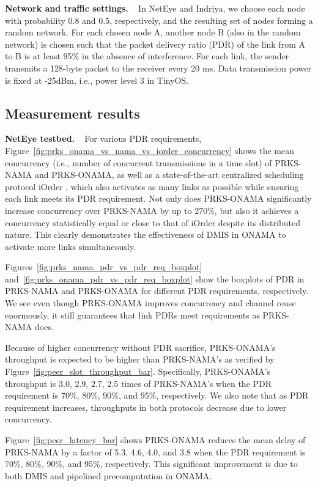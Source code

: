 \documentclass[conference]{IEEEtran}
\newcommand{\vSpacing}{\vspace*{0.05cm}}
\newcommand{\subHeading}[1]{
\vSpacing
\noindent \textbf{#1} \  
}
\begin{document}
\subHeading{Network and traffic settings.}
In NetEye and Indriya, we choose each node with probability 0.8 and 0.5, respectively, and the resulting set of nodes forming a random network. For each chosen node A, another node B (also in the random network) is chosen such that the packet delivery ratio (PDR) of the link from A to B is at least 95\% in the absence of interference. For each link, the sender transmits a 128-byte packet to the receiver every 20 ms. Data transmission power is fixed at -25dBm, i.e., power level 3 in TinyOS.


\subsection{Measurement results}
\subHeading{NetEye testbed.}
For various PDR requirements, Figure~\ref{fig:prks_onama_vs_nama_vs_iorder_concurrency} shows the mean concurrency (i.e., number of concurrent transmissions in a time slot) of PRKS-NAMA and PRKS-ONAMA, as well as a state-of-the-art centralized scheduling protocol iOrder \cite{iorder:che:icnp11}, which also activates as many links as possible while ensuring each link meets its PDR requirement. Not only does PRKS-ONAMA significantly increase concurrency over PRKS-NAMA by up to 270\%, but also it achieves a concurrency statistically equal or close to that of iOrder despite its distributed nature. This clearly demonstrates the effectiveness of DMIS in ONAMA to activate more links simultaneously.

Figures~\ref{fig:prks_nama_pdr_vs_pdr_req_boxplot} and~\ref{fig:prks_onama_pdr_vs_pdr_req_boxplot} show the boxplots of PDR in PRKS-NAMA and PRKS-ONAMA for different PDR requirements, respectively. We see even though PRKS-ONAMA improves concurrency and channel reuse enormously, it still guarantees that link PDRs meet requirements as PRKS-NAMA does. 

Because of higher concurrency without PDR sacrifice, PRKS-ONAMA's throughput is expected to be higher than PRKS-NAMA's as verified by Figure~\ref{fig:peer_slot_throughput_bar}. Specifically, PRKS-ONAMA's throughput is 3.0, 2.9, 2.7, 2.5 times of PRKS-NAMA's when the PDR requirement is 70\%, 80\%, 90\%, and 95\%, respectively. We also note that as PDR requirement increases, throughputs in both protocols decrease due to lower concurrency.

Figure~\ref{fig:peer_latency_bar} shows PRKS-ONAMA reduces the mean delay of PRKS-NAMA by a factor of 5.3, 4.6, 4.0, and 3.8 when the PDR requirement is 70\%, 80\%, 90\%, and 95\%, respectively. This significant improvement is due to both DMIS and pipelined precomputation in ONAMA.
\end{document}

